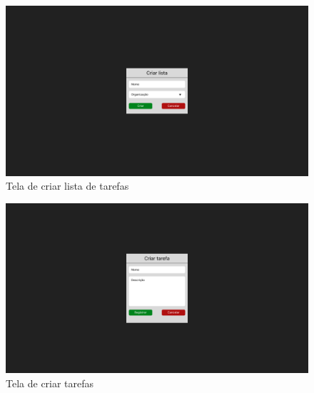 \begin{figure}[h]
    \centering
    \includegraphics[width=1\textwidth]{../figures/criar-lista.png}
    \caption{Tela de criar lista de tarefas}
    \label{fig:criar-lista}
\end{figure}

\begin{figure}[h]
    \centering
    \includegraphics[width=1\textwidth]{../figures/criar-tarefa.png}
    \caption{Tela de criar tarefas}
    \label{fig:criar-tarefa}
\end{figure}